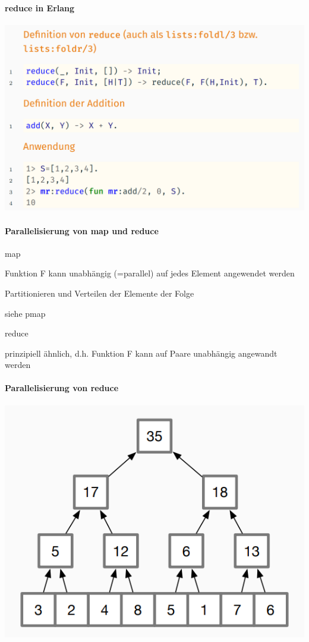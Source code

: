 \documentclass[10pt]{article}
\begin{document}
  \paragraph{reduce in Erlang}
  
  \begin{center}
    \includegraphics[width=0.4\linewidth]{Assets/Programmierparadigmen-erlang-reduce}
  \end{center}
  
  \paragraph{Parallelisierung von map und reduce}
  
  \color{orange} map \color{black}
  \begin{itemize*}
    \item Funktion F kann unabhängig (=parallel) auf jedes Element angewendet werden
    \item Partitionieren und Verteilen der Elemente der Folge
    \item siehe pmap
  \end{itemize*}
  \color{orange} reduce \color{black}
  \begin{itemize*}
    \item prinzipiell ähnlich, d.h. Funktion F kann auf Paare unabhängig angewandt werden
  \end{itemize*}
  
  \paragraph{Parallelisierung von reduce}
  
  \begin{center}
    \includegraphics[width=0.5\linewidth]{Assets/Programmierparadigmen-erlang-reduce-parallel}
  \end{center}
  
\end{document}

